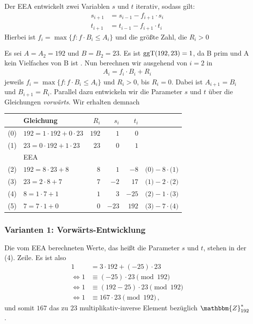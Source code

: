 Der EEA entwickelt zwei Variablen $s$ und $t$ iterativ, sodass gilt:
\begin{align*} s_{i+1} &= s_{i-1} - f_{i+1} \cdot s_{i}\\ t_{i+1} &=
                                                                    t_{i-1} - f_{i+1} \cdot t_{i}
\end{align*} Hierbei ist $f_i = \max \{f : f \cdot B_i \leq A_i\}$
und die größte Zahl, die $R_i > 0$
\begin{beispiel}[EEA] Es sei $A = A_2 = 192 $ und $B = B_2 = 23$. Es
  ist $\operatorname{ggT}(192, 23) = 1$, da B prim und A kein Vielfaches von B ist . Nun
  berechnen wir ausgehend von $i = 2$ in
  \begin{align*} A_i = f_i \cdot B_i + R_i
  \end{align*} jeweils $f_i = \max \{f : f \cdot B_i \leq A_i\}$ und
  $R_i > 0$, bis $R_i = 0$. Dabei ist $A_{i+1} = B_i$ und $B_{i+1} =
  R_i$. Parallel dazu entwickeln wir die Parameter $s$ und $t$ über die
  Gleichungen \emph{vorwärts}. Wir erhalten demnach
  \begin{table}[h] \centering \large
    \begin{tabular}[c]{|c|l|rrr|l|} \hline & Gleichung & $R_i$ & $s_i$ & $t_i$ &\\ 
      \hline 
      \hline 
      (0) & $192 = 1 \cdot 192 + 0 \cdot 23$ & $192$ & $1$ & $0$ &\\
      (1) & $23 = 0 \cdot 192 + 1 \cdot 23$ & $23$ & $0$ & $1$   &\\ 
      \hline 
          & EEA & & & &\\ 
      \hline 
      (2) & $192 = 8 \cdot 23 + 8$ & $8$ & $1$ & $-8$ & $\text{(0)} - 8 \cdot\text{(1)}$\\
      (3) & $23 = 2 \cdot 8 + 7$ & $7$ & $-2$ & $17$ & $\text{(1)} - 2  \cdot \text{(2)}$\\ 
      (4) & $8 = 1 \cdot 7 + 1$ & $1$ & $3$ & $-25$ & $\text{(2)} - 1 \cdot \text{(3)}$\\
      (5) & $7 = 7 \cdot 1 + 0$ & $0$ & $-23$ & $192$ & $\text{(3)} - 7 \cdot\text{(4)}$\\ 
      \hline
    \end{tabular}
  \end{table}
  \subsubsection*{Varianten 1: Vorwärts-Entwicklung} Die vom EEA
  berechneten Werte, das heißt die Parameter $s$ und $t$, stehen in der
  (4). Zeile. Es ist also
  \begin{align*} 1    &= 3 \cdot 192 + (-25) \cdot 23\\ 
    \Leftrightarrow 1 &\equiv (-25) \cdot 23 \pmod{192}\\ 
    \Leftrightarrow 1 &\equiv (192 - 25)\cdot 23 \pmod{192}\\
    \Leftrightarrow 1 &\equiv 167 \cdot 23 \pmod{192}\, \text{,}
  \end{align*} 
  und somit $167$ das zu $23$ multiplikativ-inverse Element bezüglich
  $\mathbbm{Z}^{\ast}_{192}$.

\end{beispiel}
